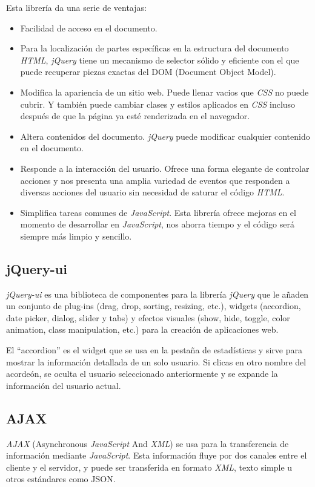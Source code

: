 \documentclass[a4paper, 12pt]{book}
\begin{document}
Esta librer\'ia da una serie de ventajas: 
\begin{itemize}
  \item Facilidad de acceso en el documento.
  \item Para la localizaci\'on de partes espec\'ificas en la estructura del documento \textit{HTML}, \textit{jQuery} tiene un mecanismo de selector s\'olido y 
eficiente con el que puede recuperar piezas exactas del DOM (Document Object Model).
  \item Modifica la apariencia de un sitio web. Puede llenar vacios que \textit{CSS} no puede cubrir. Y tambi\'en puede cambiar clases y estilos aplicados 
en \textit{CSS} incluso despu\'es de que la p\'agina ya est\'e renderizada en el navegador.
  \item Altera contenidos del documento. \textit{jQuery} puede modificar cualquier contenido en el documento.
  \item Responde a la interacci\'on del usuario. Ofrece una forma elegante de controlar acciones y nos presenta una amplia variedad de eventos 
que responden a diversas acciones del usuario sin necesidad de saturar el c\'odigo \textit{HTML}.
  \item Simplifica tareas comunes de \textit{JavaScript}. Esta librer\'ia ofrece mejoras en el momento de desarrollar en \textit{JavaScript}, nos ahorra tiempo 
y el c\'odigo ser\'a siempre m\'as limpio y sencillo.
\end{itemize}


\subsection{jQuery-ui}
\label{subsec:jqueryui}
\textit{jQuery-ui} es una biblioteca de componentes para la librer\'ia \textit{jQuery} que le a\~naden un conjunto de plug-ins (drag, drop, sorting, 
resizing, etc.), widgets (accordion, date picker, dialog, slider y tabs) y efectos visuales (show, hide, toggle, color animation, class manipulation, etc.)
para la creaci\'on de aplicaciones web.

El ``accordion'' es el widget que se usa en la pesta\~na de estad\'isticas y sirve para mostrar la informaci\'on detallada de un solo usuario. Si clicas en 
otro nombre del acorde\'on, se oculta el usuario seleccionado anteriormente y se expande la informaci\'on del usuario actual.

\subsection{AJAX}
\label{subsec:ajax}
\textit{AJAX} (Asynchronous \textit{JavaScript} And \textit{XML}) se usa para la transferencia de informaci\'on mediante \textit{JavaScript}. Esta informaci\'on fluye por dos canales 
entre el cliente y el servidor, y puede ser transferida en formato \textit{XML}, texto simple u otros est\'andares como JSON.
\end{document}
